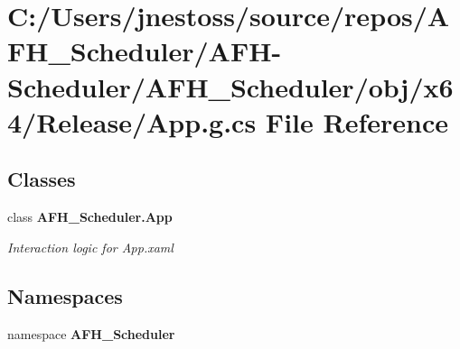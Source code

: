 \section{C\+:/\+Users/jnestoss/source/repos/\+A\+F\+H\+\_\+\+Scheduler/\+A\+F\+H-\/\+Scheduler/\+A\+F\+H\+\_\+\+Scheduler/obj/x64/\+Release/\+App.g.\+cs File Reference}
\label{x64_2_release_2_app_8g_8cs}
\subsection*{Classes}
\begin{DoxyCompactItemize}
\item 
class \textbf{ A\+F\+H\+\_\+\+Scheduler.\+App}
\begin{DoxyCompactList}\small\item\em Interaction logic for App.\+xaml \end{DoxyCompactList}\end{DoxyCompactItemize}
\subsection*{Namespaces}
\begin{DoxyCompactItemize}
\item 
namespace \textbf{ A\+F\+H\+\_\+\+Scheduler}
\end{DoxyCompactItemize}
